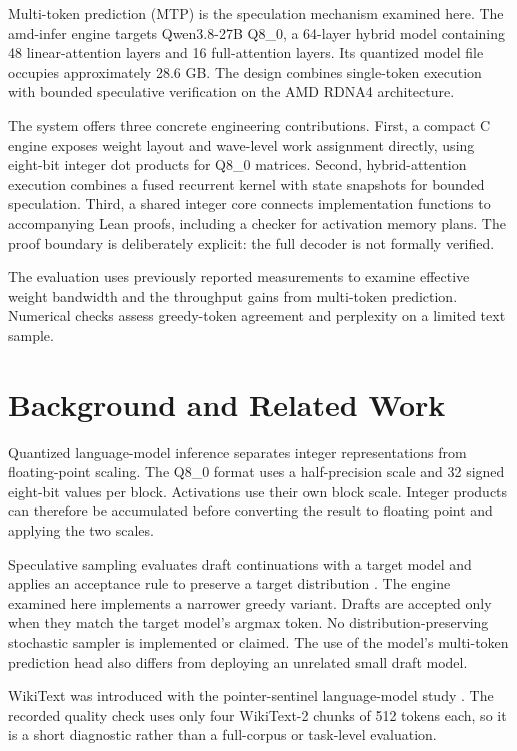 \documentclass[10pt]{article}
\begin{document}
Multi-token prediction (MTP) is the speculation mechanism examined here. The amd-infer engine targets Qwen3.8-27B Q8\_0, a 64-layer hybrid model containing 48 linear-attention layers and 16 full-attention layers. Its quantized model file occupies approximately 28.6 GB. The design combines single-token execution with bounded speculative verification on the AMD RDNA4 architecture.

The system offers three concrete engineering contributions. First, a compact C engine exposes weight layout and wave-level work assignment directly, using eight-bit integer dot products for Q8\_0 matrices. Second, hybrid-attention execution combines a fused recurrent kernel with state snapshots for bounded speculation. Third, a shared integer core connects implementation functions to accompanying Lean proofs, including a checker for activation memory plans. The proof boundary is deliberately explicit: the full decoder is not formally verified.

The evaluation uses previously reported measurements to examine effective weight bandwidth and the throughput gains from multi-token prediction. Numerical checks assess greedy-token agreement and perplexity on a limited text sample.

\section{Background and Related Work}
Quantized language-model inference separates integer representations from floating-point scaling. The Q8\_0 format uses a half-precision scale and 32 signed eight-bit values per block. Activations use their own block scale. Integer products can therefore be accumulated before converting the result to floating point and applying the two scales.

Speculative sampling evaluates draft continuations with a target model and applies an acceptance rule to preserve a target distribution \cite{chen}. The engine examined here implements a narrower greedy variant. Drafts are accepted only when they match the target model's argmax token. No distribution-preserving stochastic sampler is implemented or claimed. The use of the model's multi-token prediction head also differs from deploying an unrelated small draft model.

WikiText was introduced with the pointer-sentinel language-model study \cite{merity}. The recorded quality check uses only four WikiText-2 chunks of 512 tokens each, so it is a short diagnostic rather than a full-corpus or task-level evaluation.
\end{document}
